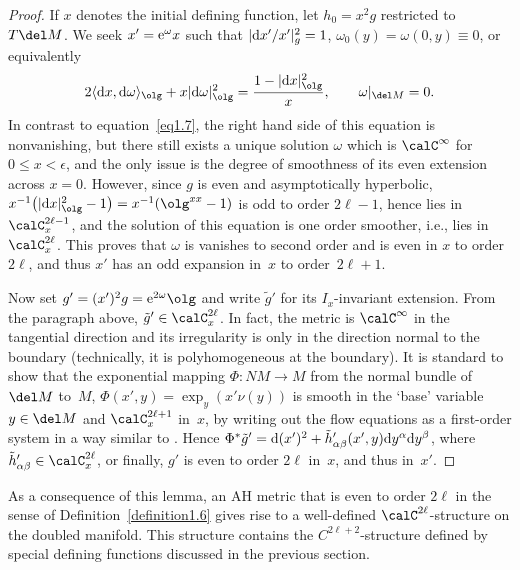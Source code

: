 \begin{proof}If $x$ denotes the initial defining function, let $h_0 = x^2 g$ restricted to $T\del M$. We seek $x' = {\rm e}^{\omega} x$ such that $ |{\rm d}x'/x'|^2_g = 1$, $\omega_0(y) = \omega(0,y) \equiv 0$, or equivalently
\begin{gather*} %
2 \langle {\rm d}x, {\rm d}\omega\rangle_{\olg} + x |{\rm d}\omega|^2_{\olg} = \frac{1 - |{\rm d}x|^2_{\olg}}{x}, \qquad \omega |_{\del M} = 0.
\end{gather*}
In contrast to equation~\eqref{eq1.7}, the right hand side of this equation is nonvanishing, but there still exists a unique solution $\omega$ which is $\calC^\infty$ for $0 \leq x < \epsilon$, and the only issue is the degree of smoothness of its even extension across $x=0$. However, since $g$ is even and asymptotically hyperbolic, $ x^{-1}\big(|{\rm d}x|^2_{\olg} - 1\big) = x^{-1} (\olg^{xx} - 1)$ is odd to order $2\ell-1$, hence lies in $\calC^{2\ell-1}_x$, and the solution of this equation is one order smoother, i.e., lies in $\calC^{2\ell}_x$. This proves that $\omega$ is vanishes to second order and is even in $x$ to order~$2\ell$, and thus $x'$ has an odd expansion in~$x$ to order~$2 \ell+1$.

Now set $g' = (x')^2 g = {\rm e}^{2\omega} \olg$ and write $\tilde{g}'$ for its $I_x$-invariant extension. From the paragraph above, $\tilde{g}' \in \calC^{2\ell}_x$. In fact, the metric is $\calC^\infty$ in the tangential direction and its irregularity is only in the direction normal to the boundary (technically, it is polyhomogeneous at the boundary). It is standard to show that the exponential mapping $\Phi\colon NM \to M$ from the normal bundle of~$\del M$ to~$M$, $\Phi(x',y) = \exp_y( x' \nu(y))$ is smooth in the `base' variable $y \in \del M$ and $\calC^{2\ell+1}_x$ in~$x$, by writing out the flow equations as a first-order system in a way similar to \cite[p.~6]{Guillarmou}. Hence $\Phi^*\tilde{g}' = {\rm d}(x')^2 + \tilde{h}'_{\alpha \beta}(x',y) {\rm d}y^\alpha {\rm d}y^\beta$, where $\tilde{h}'_{\alpha \beta} \in \calC^{2\ell}_x$, or finally, $g'$ is even to order $2\ell$ in~$x$, and thus in~$x'$.
\end{proof}

As a consequence of this lemma, an AH metric that is even to order $2\ell$ in the sense of Definition~\ref{definition1.6} gives rise to a well-defined $\calC^{2\ell}$-structure on the doubled manifold. This structure contains the $C^{2\ell+2}$-structure defined by special defining functions discussed in the previous section.


